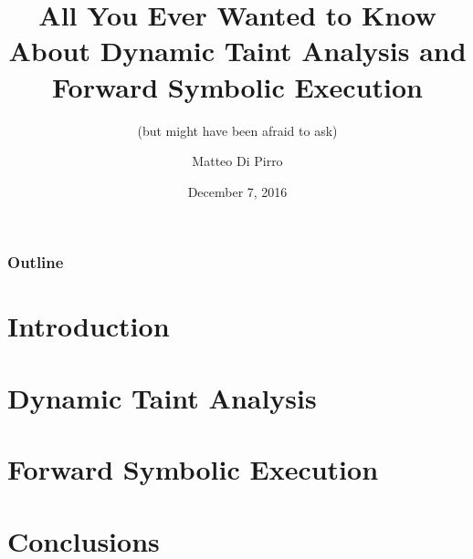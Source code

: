 \documentclass{beamer}
\title{All You Ever Wanted to Know About Dynamic Taint Analysis and Forward Symbolic Execution}
\subtitle{(but might have been afraid to ask)}
\author{Matteo Di Pirro}
\date{December 7, 2016}
\institute{University of Padova}
\begin{document}
\begin{frame}
\titlepage
\end{frame}

\begin{frame}
	\frametitle{Outline}
	\tableofcontents
\end{frame}

\section{Introduction}



\section{Dynamic Taint Analysis}





\section{Forward Symbolic Execution}




\section{Conclusions}



\appendix
\makethanks
\newcommand{\turnOffNumbers}{}

\end{document}
